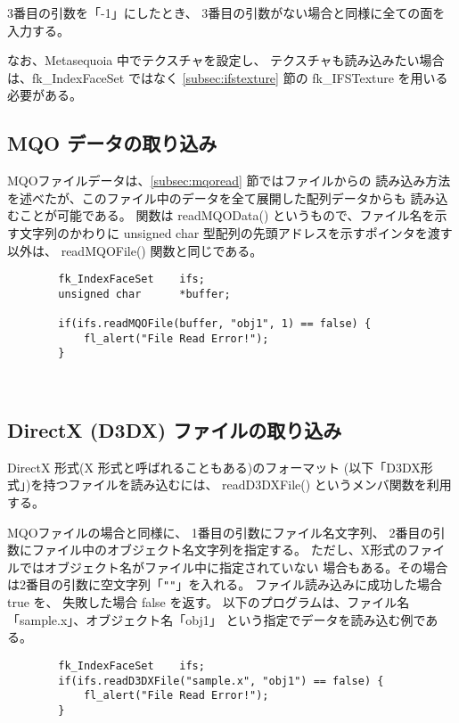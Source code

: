 3番目の引数を「-1」にしたとき、
3番目の引数がない場合と同様に全ての面を入力する。

なお、Metasequoia 中でテクスチャを設定し、
テクスチャも読み込みたい場合は、fk\_IndexFaceSet ではなく
\ref{subsec:ifstexture} 節の fk\_IFSTexture を用いる必要がある。

\subsection{MQO データの取り込み} \label{subsec:mqodata}
MQOファイルデータは、\ref{subsec:mqoread} 節ではファイルからの
読み込み方法を述べたが、このファイル中のデータを全て展開した配列データからも
読み込むことが可能である。
関数は readMQOData() というもので、ファイル名を示す文字列のかわりに
unsigned char 型配列の先頭アドレスを示すポインタを渡す以外は、
readMQOFile() 関数と同じである。
\begin{screen}
\begin{verbatim}
        fk_IndexFaceSet    ifs;
        unsigned char      *buffer;

        if(ifs.readMQOFile(buffer, "obj1", 1) == false) {
            fl_alert("File Read Error!");
        }
\end{verbatim}
\end{screen} ~

\subsection{DirectX (D3DX) ファイルの取り込み} \label{subsec:d3dxread}
DirectX 形式(X 形式と呼ばれることもある)のフォーマット
(以下「D3DX形式」)を持つファイルを読み込むには、
readD3DXFile() というメンバ関数を利用する。

MQOファイルの場合と同様に、
1番目の引数にファイル名文字列、
2番目の引数にファイル中のオブジェクト名文字列を指定する。
ただし、X形式のファイルではオブジェクト名がファイル中に指定されていない
場合もある。その場合は2番目の引数に空文字列「\verb+""+」を入れる。
ファイル読み込みに成功した場合 true を、
失敗した場合 false を返す。
以下のプログラムは、ファイル名「sample.x」、オブジェクト名「obj1」
という指定でデータを読み込む例である。
\\
\begin{screen}
\begin{verbatim}
        fk_IndexFaceSet    ifs;
        if(ifs.readD3DXFile("sample.x", "obj1") == false) {
            fl_alert("File Read Error!");
        }
\end{verbatim}
\end{screen} ~

